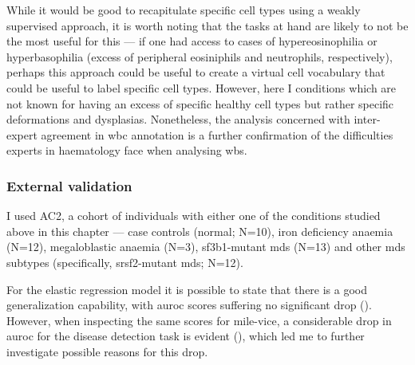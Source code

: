 While it would be good to recapitulate specific cell types using a weakly supervised approach, it is worth noting that the tasks at hand are likely to not be the most useful for this --- if one had access to cases of hypereosinophilia or hyperbasophilia (excess of peripheral eosiniphils and neutrophils, respectively), perhaps this approach could be useful to create a virtual cell vocabulary that could be useful to label specific cell types. However, here I conditions which are not known for having an excess of specific healthy cell types but rather specific deformations and dysplasias. Nonetheless, the analysis concerned with inter-expert agreement in \ac{wbc} annotation is a further confirmation of the difficulties experts in haematology face when analysing \ac{wbs}.

\subsubsection{External validation}

I used AC2, a cohort of individuals with either one of the conditions studied above in this chapter --- case controls (normal; N=10), iron deficiency anaemia (N=12), megaloblastic anaemia (N=3), \ac{sf3b1}-mutant \ac{mds} (N=13) and other \ac{mds} subtypes (specifically, \ac{srsf2}-mutant \ac{mds}; N=12). 

For the elastic regression model it is possible to state that there is a good generalization capability, with \ac{auroc} scores suffering no significant drop (). However, when inspecting the same scores for \ac{mile-vice}, a considerable drop in \ac{auroc} for the disease detection task is evident (), which led me to further investigate possible reasons for this drop.

\begin{figure}[!ht]
    \label{fig:glmnet-auc-validation}
\end{figure}

\begin{figure}[!ht]
    \label{fig:mile-vice-auc-validation}
\end{figure}

